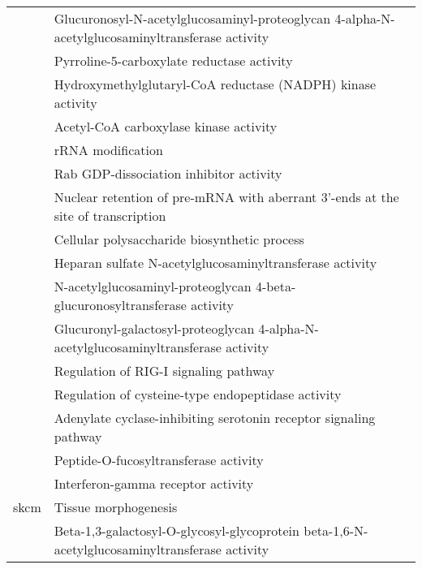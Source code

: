 \begin{appendices}
\begin{longtable}{lp{}}
									 & Glucuronosyl-N-acetylglucosaminyl-proteoglycan 4-alpha-N-acetylglucosaminyltransferase activity \\
									 & Pyrroline-5-carboxylate reductase activity                                                      \\
									 & Hydroxymethylglutaryl-CoA reductase (NADPH) kinase activity                                     \\
									 & Acetyl-CoA carboxylase kinase activity                                                          \\
									 & rRNA modification                                                                               \\
									 & Rab GDP-dissociation inhibitor activity                                                         \\
									 & Nuclear retention of pre-mRNA with aberrant 3'-ends at the site of transcription                \\
									 & Cellular polysaccharide biosynthetic process                                                    \\
									 & Heparan sulfate N-acetylglucosaminyltransferase activity                                        \\
									 & N-acetylglucosaminyl-proteoglycan 4-beta-glucuronosyltransferase activity                       \\
									 & Glucuronyl-galactosyl-proteoglycan 4-alpha-N-acetylglucosaminyltransferase activity             \\
									 & Regulation of RIG-I signaling pathway                                                           \\
									 & Regulation of cysteine-type endopeptidase activity                                              \\
									 & Adenylate cyclase-inhibiting serotonin receptor signaling pathway                               \\
									 & Peptide-O-fucosyltransferase activity                                                           \\
									 & Interferon-gamma receptor activity                                                              \\
		\hline
		\gls{skcm}                   & Tissue morphogenesis                                                                            \\
									 & Beta-1,3-galactosyl-O-glycosyl-glycoprotein beta-1,6-N-acetylglucosaminyltransferase activity   \\

\end{longtable}
\end{appendices}
